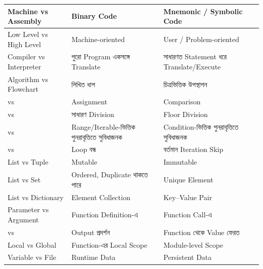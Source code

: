 
\begin{longtable}{
|L{0.23\textwidth}
|L{0.335\textwidth}
|L{0.335\textwidth}|
}

\endfirsthead

\endhead

Machine vs Assembly
&
Binary Code
&
Mnemonic / Symbolic Code
\\
\hline

Low Level vs High Level
&
Machine-oriented
&
User / Problem-oriented
\\
\hline

Compiler vs Interpreter
&
পুরো Program একসঙ্গে Translate
&
সাধারণত Statement ধরে Translate/Execute
\\
\hline

Algorithm vs Flowchart
&
লিখিত ধাপ
&
চিত্রভিত্তিক উপস্থাপন
\\
\hline

\py{=} vs \py{==}
&
Assignment
&
Comparison
\\
\hline

\py{/} vs \py{//}
&
সাধারণ Division
&
Floor Division
\\
\hline

 vs 
&
Range/Iterable-ভিত্তিক পুনরাবৃত্তিতে সুবিধাজনক
&
Condition-ভিত্তিক পুনরাবৃত্তিতে সুবিধাজনক
\\
\hline

 vs 
&
Loop বন্ধ
&
বর্তমান Iteration Skip
\\
\hline

List vs Tuple
&
Mutable
&
Immutable
\\
\hline

List vs Set
&
Ordered, Duplicate থাকতে পারে
&
Unique Element
\\
\hline

List vs Dictionary
&
Element Collection
&
Key--Value Pair
\\
\hline

Parameter vs Argument
&
Function Definition-এ
&
Function Call-এ
\\
\hline

 vs 
&
Output প্রদর্শন
&
Function থেকে Value ফেরত
\\
\hline

Local vs Global
&
Function-এর Local Scope
&
Module-level Scope
\\
\hline

Variable vs File
&
Runtime Data
&
Persistent Data
\\
\hline

\end{longtable}

